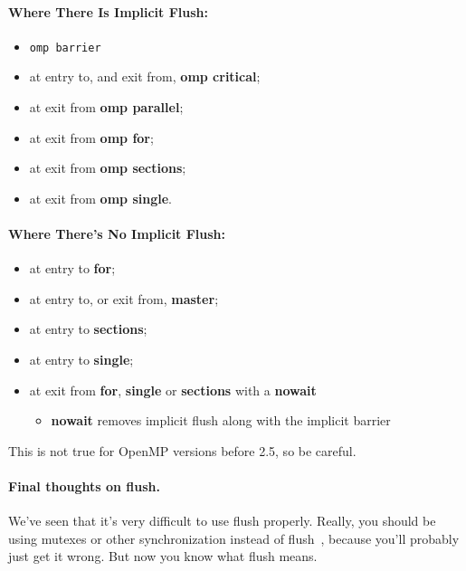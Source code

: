 \paragraph{Where There Is Implicit Flush:}
  \begin{itemize}[noitemsep]
    \item {\tt omp barrier}
    \item at entry to, and exit from, {\bf omp critical};
    \item at exit from {\bf omp parallel}; 
    \item at exit from {\bf omp for};
    \item at exit from {\bf omp sections};
    \item at exit from {\bf omp single}.
  \end{itemize}

\paragraph{Where There's No Implicit Flush:}
  \begin{itemize}[noitemsep]
    \item at entry to {\bf for};
    \item at entry to, or exit from, {\bf master};
    \item at entry to {\bf sections};
    \item at entry to {\bf single};
    \item at exit from {\bf for}, {\bf single} or {\bf sections} with a {\bf nowait}
      \begin{itemize}
        \item {\bf nowait} removes implicit flush along with the implicit barrier
      \end{itemize}
  \end{itemize}

This is not true for OpenMP versions before 2.5, so be careful.

\paragraph{Final thoughts on flush.} We've seen that it's very difficult to use flush properly. Really, you should be using mutexes or other synchronization instead of flush~\cite{flush}, because you'll probably just get it wrong. But now you know what flush means.


